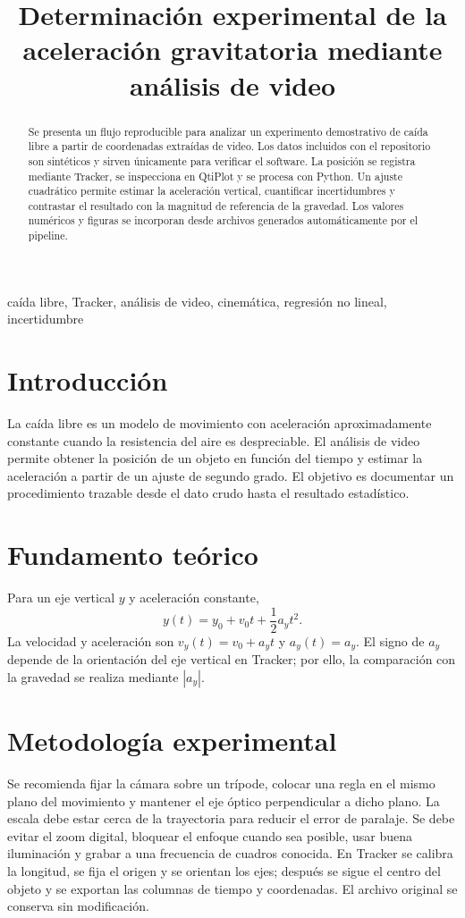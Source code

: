 \documentclass[conference]{IEEEtran}
\title{Determinación experimental de la aceleración gravitatoria mediante análisis de video}
\author{\IEEEauthorblockN{Nombre del estudiante}
\IEEEauthorblockA{Curso o laboratorio\\Institución\\Correo electrónico}}
\begin{document}
\maketitle


\begin{abstract}
Se presenta un flujo reproducible para analizar un experimento demostrativo de caída libre a partir de coordenadas extraídas de video. Los datos incluidos con el repositorio son sintéticos y sirven únicamente para verificar el software. La posición se registra mediante Tracker, se inspecciona en QtiPlot y se procesa con Python. Un ajuste cuadrático permite estimar la aceleración vertical, cuantificar incertidumbres y contrastar el resultado con la magnitud de referencia de la gravedad. Los valores numéricos y figuras se incorporan desde archivos generados automáticamente por el pipeline.
\end{abstract}

\begin{IEEEkeywords}
caída libre, Tracker, análisis de video, cinemática, regresión no lineal, incertidumbre
\end{IEEEkeywords}

\section{Introducción}
La caída libre es un modelo de movimiento con aceleración aproximadamente constante cuando la resistencia del aire es despreciable. El análisis de video permite obtener la posición de un objeto en función del tiempo y estimar la aceleración a partir de un ajuste de segundo grado. El objetivo es documentar un procedimiento trazable desde el dato crudo hasta el resultado estadístico.

\section{Fundamento teórico}
Para un eje vertical $y$ y aceleración constante,
\begin{equation}
 y(t)=y_0+v_0t+\frac{1}{2}a_yt^2.
 \label{eq:position}
\end{equation}
La velocidad y aceleración son $v_y(t)=v_0+a_yt$ y $a_y(t)=a_y$. El signo de $a_y$ depende de la orientación del eje vertical en Tracker; por ello, la comparación con la gravedad se realiza mediante $|a_y|$.

\section{Metodología experimental}
Se recomienda fijar la cámara sobre un trípode, colocar una regla en el mismo plano del movimiento y mantener el eje óptico perpendicular a dicho plano. La escala debe estar cerca de la trayectoria para reducir el error de paralaje. Se debe evitar el zoom digital, bloquear el enfoque cuando sea posible, usar buena iluminación y grabar a una frecuencia de cuadros conocida. En Tracker se calibra la longitud, se fija el origen y se orientan los ejes; después se sigue el centro del objeto y se exportan las columnas de tiempo y coordenadas. El archivo original se conserva sin modificación.
\end{document}
